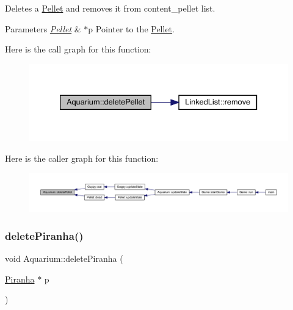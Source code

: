 Deletes a \mbox{\hyperlink{class_pellet}{Pellet}} and removes it from content\+\_\+pellet list. 
\begin{DoxyParams}{Parameters}
{\em \mbox{\hyperlink{class_pellet}{Pellet}}} & $\ast$p Pointer to the \mbox{\hyperlink{class_pellet}{Pellet}}. \\
\hline
\end{DoxyParams}
Here is the call graph for this function\+:\nopagebreak
\begin{figure}[H]
\begin{center}
\leavevmode
\includegraphics[width=333pt]{class_aquarium_a61329fb56bcb5af2e06fc62568456f1b_cgraph}
\end{center}
\end{figure}
Here is the caller graph for this function\+:\nopagebreak
\begin{figure}[H]
\begin{center}
\leavevmode
\includegraphics[width=350pt]{class_aquarium_a61329fb56bcb5af2e06fc62568456f1b_icgraph}
\end{center}
\end{figure}
\mbox{\label{class_aquarium_a86cec76f7e0cbbdff79d5cef1e6e7f84}} 
\subsubsection{\texorpdfstring{delete\+Piranha()}{deletePiranha()}}
{\footnotesize\ttfamily void Aquarium\+::delete\+Piranha (\begin{DoxyParamCaption}\item[{\mbox{\hyperlink{class_piranha}{Piranha}} $\ast$}]{p }\end{DoxyParamCaption})}




